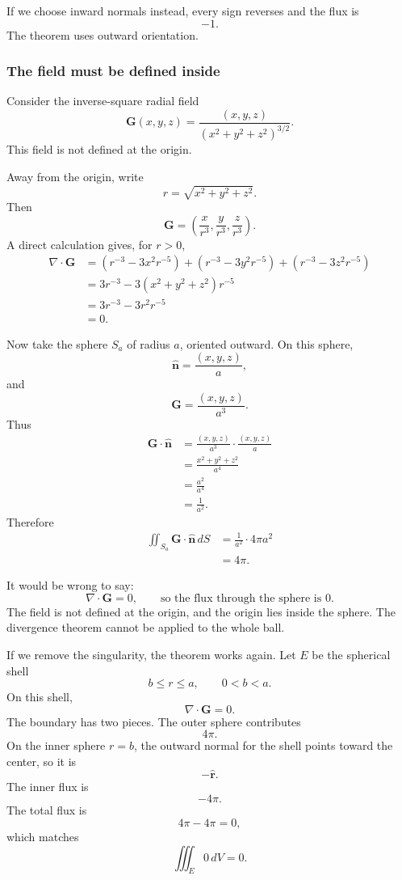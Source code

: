 If we choose inward normals instead, every sign reverses and the flux is
\[
    -1.
\]
The theorem uses outward orientation.

\subsubsection*{The field must be defined inside}

Consider the inverse-square radial field
\[
    \mathbf G(x,y,z)
    =
    \frac{(x,y,z)}{(x^2+y^2+z^2)^{3/2}}.
\]
This field is not defined at the origin.

Away from the origin, write
\[
    r=\sqrt{x^2+y^2+z^2}.
\]
Then
\[
    \mathbf G=\left(\frac{x}{r^3},\frac{y}{r^3},\frac{z}{r^3}\right).
\]
A direct calculation gives, for \(r>0\),
\[
\begin{aligned}
\nabla\cdot\mathbf G
&=
\left(r^{-3}-3x^2r^{-5}\right)
+
\left(r^{-3}-3y^2r^{-5}\right)
+
\left(r^{-3}-3z^2r^{-5}\right)\\
&=
3r^{-3}-3(x^2+y^2+z^2)r^{-5}\\
&=
3r^{-3}-3r^2r^{-5}\\
&=
0.
\end{aligned}
\]

Now take the sphere \(S_a\) of radius \(a\), oriented outward.  On this sphere,
\[
    \widehat{\mathbf n}=\frac{(x,y,z)}{a},
\]
and
\[
    \mathbf G=\frac{(x,y,z)}{a^3}.
\]
Thus
\[
\begin{aligned}
\mathbf G\cdot\widehat{\mathbf n}
&=
\frac{(x,y,z)}{a^3}\cdot \frac{(x,y,z)}{a}\\
&=
\frac{x^2+y^2+z^2}{a^4}\\
&=
\frac{a^2}{a^4}\\
&=
\frac1{a^2}.
\end{aligned}
\]
Therefore
\[
\begin{aligned}
\iint_{S_a}\mathbf G\cdot\widehat{\mathbf n}\,dS
&=
\frac1{a^2}\cdot 4\pi a^2\\
&=
4\pi.
\end{aligned}
\]

It would be wrong to say:
\[
    \nabla\cdot\mathbf G=0,
    \qquad
    \text{so the flux through the sphere is }0.
\]
The field is not defined at the origin, and the origin lies inside the sphere.  The
divergence theorem cannot be applied to the whole ball.

If we remove the singularity, the theorem works again.  Let \(E\) be the spherical shell
\[
    b\le r\le a,
    \qquad 0<b<a.
\]
On this shell,
\[
    \nabla\cdot\mathbf G=0.
\]
The boundary has two pieces.  The outer sphere contributes
\[
    4\pi.
\]
On the inner sphere \(r=b\), the outward normal for the shell points toward the center,
so it is
\[
    -\widehat{\mathbf r}.
\]
The inner flux is
\[
    -4\pi.
\]
The total flux is
\[
    4\pi-4\pi=0,
\]
which matches
\[
    \iiint_E 0\,dV=0.
\]

